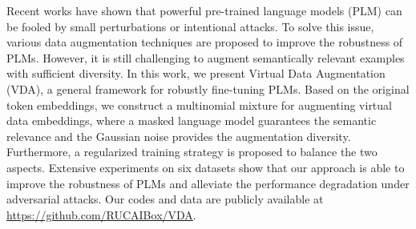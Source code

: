 Recent works have shown that powerful pre-trained language models (PLM) can be fooled by  small perturbations or intentional attacks. To solve this issue, various data augmentation techniques are proposed to improve the robustness of PLMs. However, it is still challenging to augment semantically relevant examples with sufficient diversity. In this work, we present Virtual Data Augmentation (VDA), a general framework for robustly fine-tuning PLMs. Based on the original token embeddings, we construct a multinomial mixture for augmenting virtual data embeddings, where a masked language model guarantees the semantic relevance and the Gaussian noise provides the augmentation diversity. Furthermore, a regularized training strategy is proposed to balance  the two aspects. Extensive experiments on six datasets show that our approach is able to improve the robustness of PLMs and alleviate the performance degradation under adversarial attacks. Our codes and data are publicly available at \textcolor{blue}{\url{https://github.com/RUCAIBox/VDA}}.
